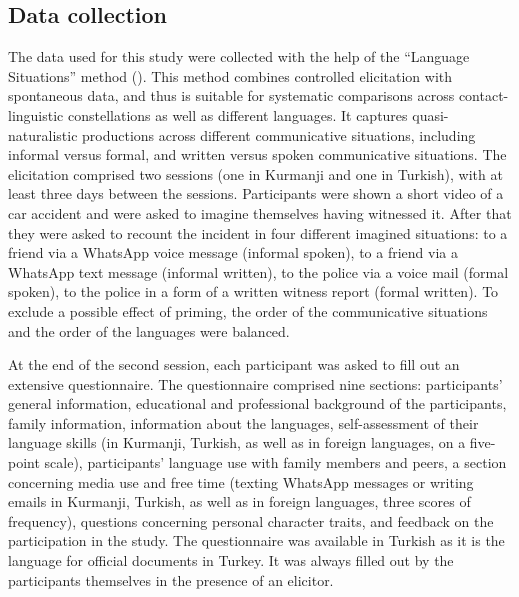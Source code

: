 \documentclass[output=paper,colorlinks,citecolor=brown]{langscibook}
\begin{document}
\subsection{Data collection}\label{bilingual:ss:5.2}

\begin{sloppypar}
The data used for this study were collected with the help of the ``Language Situations'' method (\citealt{wiese2020language}). This method combines controlled elicitation with spontaneous data, and thus is suitable for systematic comparisons across contact-linguistic constellations as well as different languages. It captures quasi-naturalistic productions across different communicative situations, including informal versus formal, and written versus spoken communicative situations. The elicitation comprised two sessions (one in Kurmanji and one in Turkish), with at least three days between the sessions. Participants were shown a short video of a car accident and were asked to imagine themselves having witnessed it. After that they were asked to recount the incident in four different imagined situations: to a friend via a WhatsApp voice message (informal spoken), to a friend via a WhatsApp text message (informal written), to the police via a voice mail (formal spoken), to the police in a form of a written witness report (formal written). To exclude a possible effect of priming, the order of the communicative situations and the order of the languages were balanced. 
\end{sloppypar}

At the end of the second session, each participant was asked to fill out an extensive questionnaire. The questionnaire comprised nine sections: participants' general information, educational and professional background of the participants, family information, information about the languages, self-assessment of their language skills (in Kurmanji, Turkish, as well as in foreign languages, on a five-point scale), participants' language use with family members and peers, a section concerning media use and free time (texting WhatsApp messages or writing emails in Kurmanji, Turkish, as well as in foreign languages, three scores of frequency), questions concerning personal character traits, and feedback on the participation in the study. The questionnaire was available in Turkish as it is the language for official documents in Turkey. It was always filled out by the participants themselves in the presence of an elicitor.
\end{document}
